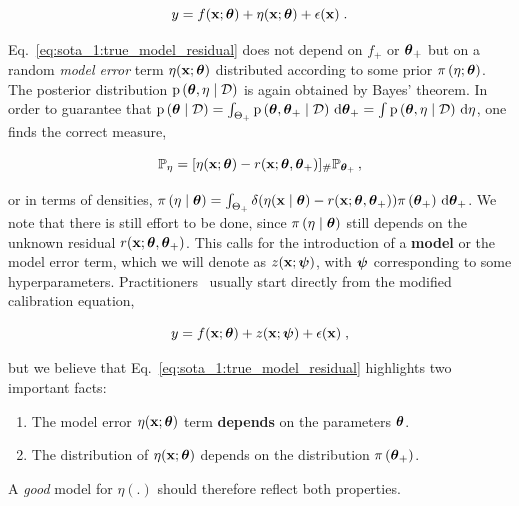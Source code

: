 \begin{equation}
    y = f(\mathbf{x}; \boldsymbol{\theta}) + \eta(\mathbf{x}; \boldsymbol{\theta}) + \epsilon(\mathbf{x}) \;.
    \label{eq:sota_1:true_model_residual}
\end{equation}

Eq.~\eqref{eq:sota_1:true_model_residual} does not depend on $f_+$ or $\boldsymbol{\theta}_+$ but on a random \textit{model error} term $\eta(\mathbf{x}; \boldsymbol{\theta})$ distributed according to some prior $\pi \left( \eta; \boldsymbol{\theta}\right)$. The posterior distribution $\mathrm{p} \left( \boldsymbol{\theta}, \eta \mid \mathcal{D} \right)$ is again obtained by Bayes' theorem. In order to guarantee that $\mathrm{p} \left( \boldsymbol{\theta} \mid \mathcal{D} \right) = \int_{\Theta_+} \mathrm{p} \left( \boldsymbol{\theta}, \boldsymbol{\theta}_+ \mid \mathcal{D} \right) \, \text{d} \boldsymbol{\theta}_+ = \int \mathrm{p} \left( \boldsymbol{\theta}, \eta \mid \mathcal{D} \right) \, \text{d} \eta$, one finds the correct measure,


\begin{equation}
    \mathbb{P}_{\eta} = [\eta(\mathbf{x};\boldsymbol{\theta})-r(\mathbf{x};\boldsymbol{\theta}, \boldsymbol{\theta}_+)]_{\#}\mathbb{P}_{\boldsymbol{\theta}_+} \,,
    \label{eq:residual_def} 
\end{equation}

or in terms of densities, $\pi \left( \eta \mid \boldsymbol{\theta}\right) = \int_{\Theta_+} \delta(\eta(\mathbf{x} \mid \boldsymbol{\theta}) - r(\mathbf{x};\boldsymbol{\theta}, \boldsymbol{\theta}_+)) \pi \left( \boldsymbol{\theta}_+\right) \, \text{d}\boldsymbol{\theta}_+$.
We note that there is still effort to be done, since $\pi \left( \eta \mid \boldsymbol{\theta}\right)$ still depends on the unknown residual $r(\mathbf{x};\boldsymbol{\theta}, \boldsymbol{\theta}_+)$. This calls for the introduction of a \textbf{model} or the model error term, which we will denote as $z(\mathbf{x}; \boldsymbol{\psi})$, with $\boldsymbol{\psi}$ corresponding to some hyperparameters. Practitioners~\cite{koh2001, uq_theory, leoni} usually start directly from the modified calibration equation,

\begin{equation}
    y = f(\mathbf{x}; \boldsymbol{\theta}) + z(\mathbf{x}; \boldsymbol{\psi}) + \epsilon(\mathbf{x}) \;,
    \label{eq:sota_1:caleq}
\end{equation}

but we believe that Eq.~\eqref{eq:sota_1:true_model_residual} highlights two important facts:

\begin{enumerate}
    \item The model error $\eta(\mathbf{x}; \boldsymbol{\theta})$ term \textbf{depends} on the parameters $\boldsymbol{\theta}$.
    \item The distribution of $\eta(\mathbf{x}; \boldsymbol{\theta})$ depends on the distribution $\pi \left( \boldsymbol{\theta}_+\right)$.
\end{enumerate}

A \textit{good} model for $\eta(.)$ should therefore reflect both properties. 

